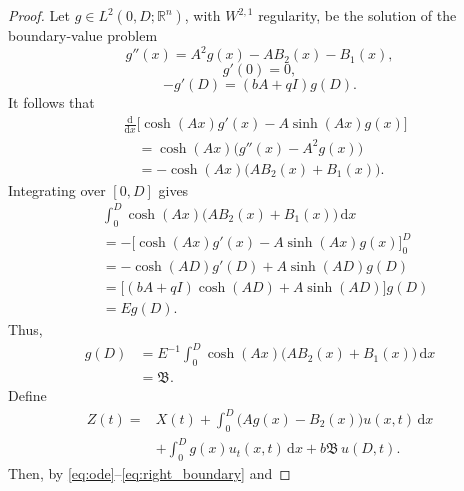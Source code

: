 \documentclass{IEEEtran}
\theoremstyle{definition}
\begin{document}
\begin{proof}
Let $g\in L^2(0,D;\mathbb R^n)$, with $W^{2,1}$ regularity, be the solution of the boundary-value
problem
\begin{equation}
 g''(x)=A^2g(x)-AB_2(x)-B_1(x),
\label{eq:kernelODE}
\end{equation}
\begin{equation}
 g'(0)=0,
\label{eq:kernelLeft}
\end{equation}
\begin{equation}
 -g'(D)=(bA+qI)g(D).
\label{eq:kernelRight}
\end{equation}
It follows that
\begin{equation}
\begin{aligned}
&\frac{\mathrm d}{\mathrm dx}\bigl[\cosh(Ax)g'(x)-A\sinh(Ax)g(x)\bigr]\\
&\quad=\cosh(Ax)\bigl(g''(x)-A^2g(x)\bigr)\\
&\quad=-\cosh(Ax)\bigl(AB_2(x)+B_1(x)\bigr).
\end{aligned}
\label{eq:kernelIdentity}
\end{equation}
Integrating over $[0,D]$ gives
\begin{equation}
\begin{aligned}
&\int_0^D\cosh(Ax)\bigl(AB_2(x)+B_1(x)\bigr)\,\mathrm dx\\
&=-\bigl[\cosh(Ax)g'(x)-A\sinh(Ax)g(x)\bigr]_0^D\\
&=-\cosh(AD)g'(D)+A\sinh(AD)g(D)\\
&=\bigl[(bA+qI)\cosh(AD)+A\sinh(AD)\bigr]g(D)\\
&=Eg(D).
\end{aligned}
\label{eq:kernelEndpointIdentity}
\end{equation}
Thus,
\begin{equation}
\begin{aligned}
g(D)&=E^{-1}\int_0^D\cosh(Ax)\bigl(AB_2(x)+B_1(x)\bigr)\,\mathrm dx\\
&=\mathfrak B.
\end{aligned}
\label{eq:kernelEndpoint}
\end{equation}
Define
\begin{equation}
\begin{aligned}
 Z(t)={}&X(t)+\int_0^D\bigl(Ag(x)-B_2(x)\bigr)u(x,t)\,\mathrm dx\\
 &+\int_0^Dg(x)u_t(x,t)\,\mathrm dx+b\mathfrak B\,u(D,t).
\end{aligned}
\label{eq:Z}
\end{equation}
Then, by \eqref{eq:ode}--\eqref{eq:right_boundary} and

\end{proof}
\end{document}

